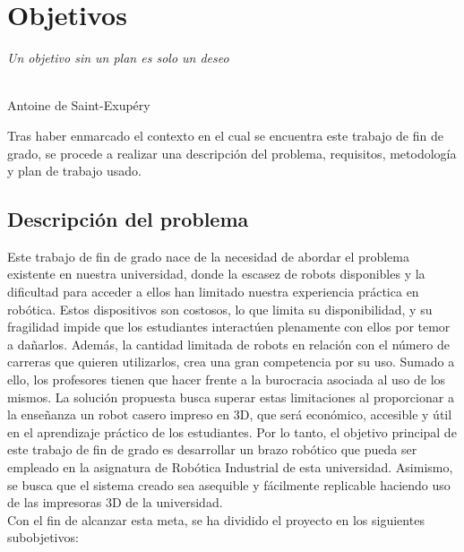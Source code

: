\chapter{Objetivos}
\label{cap:capitulo3}

\begin{flushright}
\begin{minipage}[]{10cm}
\emph{Un objetivo sin un plan es solo un deseo}\\
\end{minipage}\\

Antoine de Saint-Exupéry\\
\end{flushright}

\vspace{1cm}

Tras haber enmarcado el contexto en el cual se encuentra este trabajo de fin de grado, se procede a realizar
una descripción del problema, requisitos, metodología y plan de trabajo usado.
\section{Descripción del problema}
\label{sec:descripcion}
Este trabajo de fin de grado nace de la necesidad de abordar el problema existente en nuestra universidad, donde la escasez de 
robots disponibles y la dificultad para acceder a ellos han limitado nuestra experiencia práctica en robótica. 
Estos dispositivos son costosos, lo que limita su disponibilidad, y su fragilidad impide que los estudiantes 
interactúen plenamente con ellos por temor a dañarlos. Además, la cantidad limitada de robots en relación con el número de carreras que 
quieren utilizarlos, crea una gran competencia por su uso. Sumado a ello, los profesores tienen que hacer frente a la burocracia asociada al 
uso de los mismos. 
La solución propuesta busca superar estas limitaciones al proporcionar a la enseñanza un robot casero impreso en 3D, que será
económico, accesible y útil en el aprendizaje práctico de los estudiantes. 
Por lo tanto, el objetivo principal de este trabajo de fin de grado es desarrollar un brazo robótico que pueda ser empleado en la 
asignatura de Robótica Industrial de esta universidad. Asimismo, se busca que el sistema creado sea asequible y fácilmente replicable haciendo uso de las impresoras 3D de la universidad.\\
Con el fin de alcanzar esta meta, se ha dividido el proyecto en los siguientes subobjetivos:

